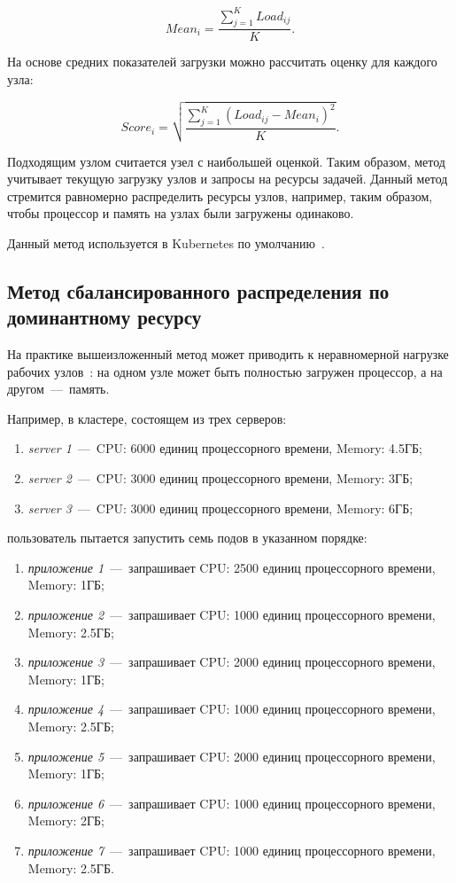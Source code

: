 \begin{equation}
	Mean_{i} = \frac{\sum_{j = 1}^{K} Load_{ij}}{K}.
\end{equation}

На основе средних показателей загрузки можно рассчитать оценку для каждого узла:

\begin{equation}
	Score_{i} = \sqrt{\frac{\sum_{j = 1}^{K} (Load_{ij} - Mean_{i})^2}{K}}.
\end{equation}

Подходящим узлом считается узел с наибольшей оценкой. Таким образом, метод учитывает текущую загрузку узлов и запросы на ресурсы задачей. Данный метод стремится равномерно распределить ресурсы узлов, например, таким образом, чтобы процессор и память на узлах были загружены одинаково.

Данный метод используется в Kubernetes по умолчанию~\cite{kubernetesbalsched}.

\subsection{Метод сбалансированного распределения по доминантному ресурсу}

На практике вышеизложенный метод может приводить к неравномерной нагрузке рабочих узлов~\cite{el2021kubcg}: на одном узле может быть полностью загружен процессор, а на другом~---~память. 

Например, в кластере, состоящем из трех серверов:

\begin{enumerate}
	\item \textit{server 1}~---~CPU: 6000 единиц процессорного времени, Memory: 4.5ГБ;
	\item \textit{server 2}~---~CPU: 3000 единиц процессорного времени, Memory: 3ГБ;
	\item \textit{server 3}~---~CPU: 3000 единиц процессорного времени, Memory: 6ГБ;
\end{enumerate}

\noindent пользователь пытается запустить семь подов в указанном порядке:

\begin{enumerate}
	\item \textit{приложение 1}~---~запрашивает CPU: 2500 единиц процессорного времени, Memory: 1ГБ;
	\item \textit{приложение 2}~---~запрашивает CPU: 1000 единиц процессорного времени, Memory: 2.5ГБ;
	\item \textit{приложение 3}~---~запрашивает CPU: 2000 единиц процессорного времени, Memory: 1ГБ;
	\item \textit{приложение 4}~---~запрашивает CPU: 1000 единиц процессорного времени, Memory: 2.5ГБ;
	\item \textit{приложение 5}~---~запрашивает CPU: 2000 единиц процессорного времени, Memory: 1ГБ;
	\item \textit{приложение 6}~---~запрашивает CPU: 1000 единиц процессорного времени, Memory: 2ГБ;
	\item \textit{приложение 7}~---~запрашивает CPU: 1000 единиц процессорного времени, Memory: 2.5ГБ.
\end{enumerate}


